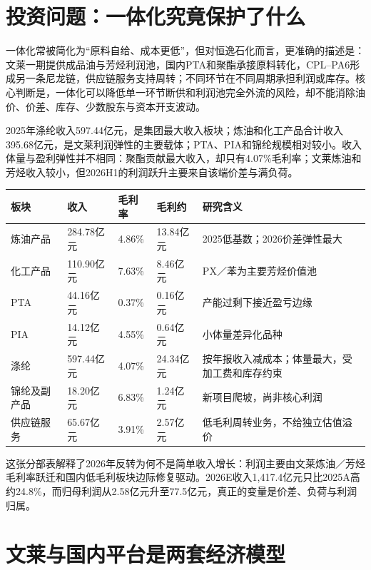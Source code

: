 \section{投资问题：一体化究竟保护了什么}

一体化常被简化为“原料自给、成本更低”，但对恒逸石化而言，更准确的描述是：文莱一期提供成品油与芳烃利润池，国内PTA和聚酯承接原料转化，CPL--PA6形成另一条尼龙链，供应链服务支持周转；不同环节在不同周期承担利润或库存。核心判断是，一体化可以降低单一环节断供和利润池完全外流的风险，却不能消除油价、价差、库存、少数股东与资本开支波动。

2025年涤纶收入597.44亿元，是集团最大收入板块；炼油和化工产品合计收入395.68亿元，是文莱利润弹性的主要载体；PTA、PIA和锦纶规模相对较小。收入体量与盈利弹性并不相同：聚酯贡献最大收入，却只有4.07\%毛利率；文莱炼油和芳烃收入较小，但2026H1的利润跃升主要来自该端价差与满负荷。

\begin{exhibitbox}
\noindent\begin{tabularx}{\textwidth}{L{2.55cm}R{2.0cm}R{1.7cm}R{2.0cm}X}
\toprule
\textbf{板块} & \textbf{收入} & \textbf{毛利率} & \textbf{毛利约} & \textbf{研究含义} \\
\midrule
炼油产品 & 284.78亿元 & 4.86\% & 13.84亿元 & 2025低基数；2026价差弹性最大 \\
化工产品 & 110.90亿元 & 7.63\% & 8.46亿元 & PX／苯为主要芳烃价值池 \\
PTA & 44.16亿元 & 0.37\% & 0.16亿元 & 产能过剩下接近盈亏边缘 \\
PIA & 14.12亿元 & 4.55\% & 0.64亿元 & 小体量差异化品种 \\
涤纶 & 597.44亿元 & 4.07\% & 24.34亿元 & 按年报收入减成本；体量最大，受加工费和库存约束 \\
锦纶及副产品 & 18.20亿元 & 6.83\% & 1.24亿元 & 新项目爬坡，尚非核心利润 \\
供应链服务 & 65.67亿元 & 3.91\% & 2.57亿元 & 低毛利周转业务，不给独立估值溢价 \\
\bottomrule
\end{tabularx}
\end{exhibitbox}

这张分部表解释了2026年反转为何不是简单收入增长：利润主要由文莱炼油／芳烃毛利率跃迁和国内低毛利板块边际修复驱动。2026E收入1,417.4亿元只比2025A高约24.8\%，而归母利润从2.58亿元升至77.5亿元，真正的变量是价差、负荷与利润归属。

\section{文莱与国内平台是两套经济模型}

